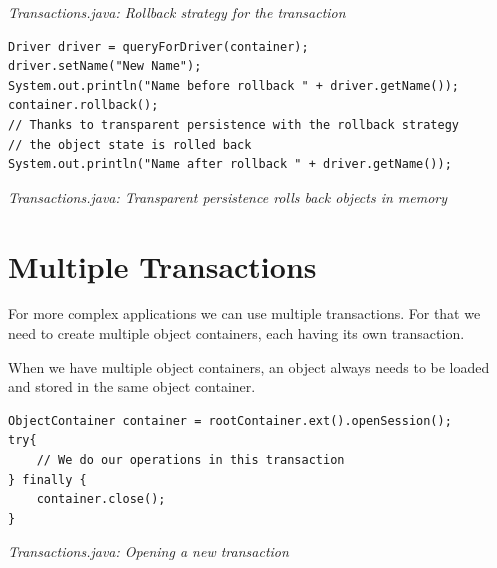 {\small\itshape Transactions.java: Rollback strategy for the transaction\par}
\medskip

\begin{lstlisting}
Driver driver = queryForDriver(container);
driver.setName("New Name");
System.out.println("Name before rollback " + driver.getName());
container.rollback();
// Thanks to transparent persistence with the rollback strategy
// the object state is rolled back
System.out.println("Name after rollback " + driver.getName());
\end{lstlisting}

{\small\itshape Transactions.java: Transparent persistence rolls back objects in memory\par}
\medskip

\section{Multiple Transactions}
\label{tut:transactions:multipletx}

For more complex applications we can use multiple transactions. For that we need to create multiple object containers, each having its own transaction.

When we have multiple object containers, an object always needs to be loaded and stored in the same object container.

\begin{lstlisting}
ObjectContainer container = rootContainer.ext().openSession();
try{
    // We do our operations in this transaction
} finally {
    container.close();
}
\end{lstlisting}

{\small\itshape Transactions.java: Opening a new transaction\par}
\medskip

